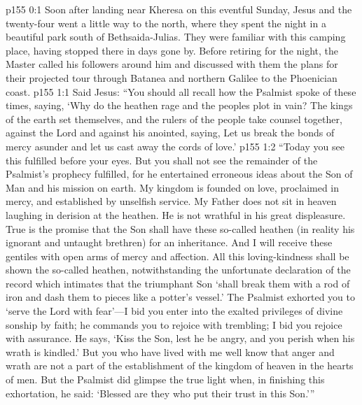 \author{Midwayer Commission}
\vs p155 0:1 Soon after landing near Kheresa on this eventful Sunday, Jesus and the twenty\hyp{}four went a little way to the north, where they spent the night in a beautiful park south of Bethsaida\hyp{}Julias. They were familiar with this camping place, having stopped there in days gone by. Before retiring for the night, the Master called his followers around him and discussed with them the plans for their projected tour through Batanea and northern Galilee to the Phoenician coast.\plusone
{}
\vs p155 1:1 Said Jesus: \textcolor{ubdarkred}{“You should all recall how the Psalmist spoke of these times, saying, ‘Why do the heathen rage and the peoples plot in vain? The kings of the earth set themselves, and the rulers of the people take counsel together, against the Lord and against his anointed, saying, Let us break the bonds of mercy asunder and let us cast away the cords of love.’}
\vs p155 1:2 \textcolor{ubdarkred}{“Today you see this fulfilled before your eyes. But you shall not see the remainder of the Psalmist’s prophecy fulfilled, for he entertained erroneous ideas about the Son of Man and his mission on earth. My kingdom is founded on love, proclaimed in mercy, and established by unselfish service. My Father does not sit in heaven laughing in derision at the heathen. He is not wrathful in his great displeasure. True is the promise that the Son shall have these so\hyp{}called heathen (in reality his ignorant and untaught brethren) for an inheritance. And I will receive these gentiles with open arms of mercy and affection. All this loving\hyp{}kindness shall be shown the so\hyp{}called heathen, notwithstanding the unfortunate declaration of the record which intimates that the triumphant Son ‘shall break them with a rod of iron and dash them to pieces like a potter’s vessel.’ The Psalmist exhorted you to ‘serve the Lord with fear’---I bid you enter into the exalted privileges of divine sonship by faith; he commands you to rejoice with trembling; I bid you rejoice with assurance. He says, ‘Kiss the Son, lest he be angry, and you perish when his wrath is kindled.’ But you who have lived with me well know that anger and wrath are not a part of the establishment of the kingdom of heaven in the hearts of men. But the Psalmist did glimpse the true light when, in finishing this exhortation, he said: ‘Blessed are they who put their trust in this Son.’”}
